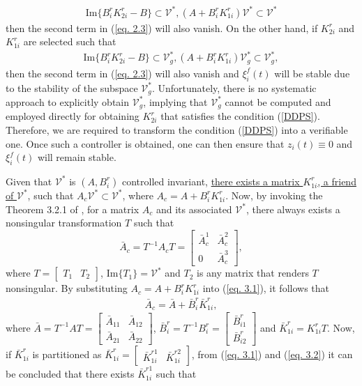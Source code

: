 \documentclass[12pt,draftcls,onecolumn]{IEEEtran}
\begin{document}
 \begin{eqnarray}
\text{Im}\{B_i^rK_{2i}^{r}-B\}\subset \mathcal{V}^*,(A+B_i^rK_{1i}^r)\mathcal{V}^*\subset\mathcal{V}^*\label{DDP}
\end{eqnarray}
 then  the second term in (\ref{eq. 2.3}) will also vanish. On the other hand, if $K_{2i}^{r}$ and $K_{1i}^r$ are selected such that 
  \begin{eqnarray}
\text{Im}\{B_i^rK_{2i}^{r}-B\}\subset \mathcal{V}_g^*,(A+B_i^rK_{1i}^r)\mathcal{V}_g^*\subset\mathcal{V}^*_g\label{DDPS},
\end{eqnarray}
 then the second term in (\ref{eq. 2.3})  will also vanish and $\xi_i^f(t)$ will be stable due to the stability of the subspace $\mathcal{V}_g^*$.
Unfortunately, there is no systematic approach to explicitly obtain $\mathcal{V}_g^*$, implying that $\mathcal{V}_g^*$ cannot be computed and employed directly for obtaining $K_{2i}^r$ that satisfies the condition (\ref{DDPS}). Therefore, we are required to transform the  condition (\ref{DDPS}) into a verifiable one. Once such a controller is obtained, one can then ensure that $z_i(t)\equiv 0$ and $\xi_i^f(t)$ will remain stable. \par
Given that $\mathcal{V}^*$ is $(A,B_i^r)$ controlled invariant, \underline{there exists a matrix $K_{1i}^{r}$, a friend of $\mathcal{V}^*$}, \cite{Basile92} such that $A_c\mathcal{V}^*\subset \mathcal{V}^*$, where $A_c=A+B_i^rK_{1i}^{r}$. Now, by invoking the Theorem 3.2.1 of \cite{Basile92}, for a matrix $A_c$ and its associated $\mathcal{V}^*$, there always exists a nonsingular transformation $T$ such that 
\begin{equation}
\bar A_{c}=T^{-1}A_cT=\begin{bmatrix}\bar{A}_c^{1}&\bar{A}_c^{2}\\0&\bar{A}_c^{3}\end{bmatrix},\label{eq. 3.1}
\end{equation}
where $T=\begin{bmatrix}T_1&T_2\end{bmatrix}$, $\text{Im}\{T_1\}=\mathcal{V}^*$ and $T_2$ is any matrix that renders $T$ nonsingular.
By substituting $A_c=A+B_i^rK_{1i}^{r}$ into (\ref{eq. 3.1}), it follows that 
\begin{eqnarray}
\bar A_{c}=\bar A+\bar B_i^r \bar K_{1i}^{r},\label{eq. 3.2}
\end{eqnarray}
where $\bar A=T^{-1}AT=\begin{bmatrix}\bar A_{11}&\bar A_{12}\\ \bar A_{21}&\bar A_{22}\end{bmatrix}$, $\bar B_i^r=T^{-1}B_i^r=\begin{bmatrix}\bar B_{i1}^r\\ \bar B_{i2}^r\end{bmatrix}$ and $\bar K_{1i}^{r}=K_{1i}^{r}T$. Now, if $\bar K_{1i}^{r}$ is  partitioned  as $\bar K_{1i}^{r}=\begin{bmatrix}\bar K_{1i}^{r1}& \bar K_{1i}^{r2}\end{bmatrix}$, from  (\ref{eq. 3.1}) and (\ref{eq. 3.2}) it can be concluded that there exists $\bar K_{1i}^{r1}$ such that 
\end{document}
